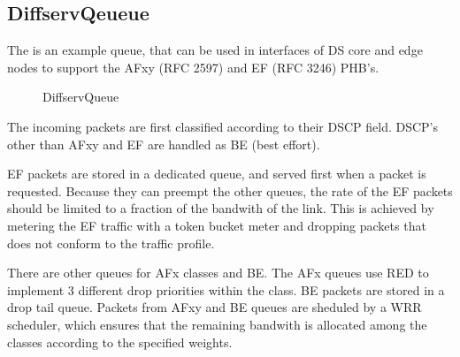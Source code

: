 \subsection{DiffservQeueue}
\label{sec:diffserv:diffservqeueue}

The  is an example queue, that can be used in
interfaces of DS core and edge nodes to support
the AFxy (RFC 2597) and EF (RFC 3246) PHB's.

\begin{figure}[htbp]
  \begin{center}
    \caption{DiffservQueue}
    \label{fig:DiffservQueue}
  \end{center}
\end{figure}

The incoming packets are first classified according to
their DSCP field. DSCP's other than AFxy and EF are handled
as BE (best effort).

EF packets are stored in a dedicated queue, and served first
when a packet is requested. Because they can preempt the other
queues, the rate of the EF packets should be limited to a fraction
of the bandwith of the link. This is achieved by metering the EF
traffic with a token bucket meter and dropping packets that
does not conform to the traffic profile.

There are other queues for AFx classes and BE. The AFx queues
use RED to implement 3 different drop priorities within the class.
BE packets are stored in a drop tail queue.
Packets from AFxy and BE queues are sheduled by a WRR scheduler,
which ensures that the remaining bandwith is allocated among the classes
according to the specified weights.



